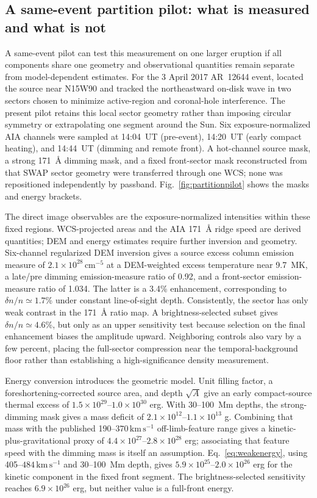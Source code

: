 \documentclass[11pt]{article}
\let\textcite\citet
\newcommand{\kms}{\mathrm{km\,s^{-1}}}
\begin{document}
\subsection{A same-event partition pilot: what is measured and what is not}
A same-event pilot can test this measurement on one larger eruption if all components share one geometry and observational quantities remain separate from model-dependent estimates. For the 3 April 2017 AR~12644 event, \textcite{OHara2019} located the source near N15W90 and tracked the northeastward on-disk wave in two sectors chosen to minimize active-region and coronal-hole interference. The present pilot retains this local sector geometry rather than imposing circular symmetry or extrapolating one segment around the Sun. Six exposure-normalized AIA channels were sampled at 14:04~UT (pre-event), 14:20~UT (early compact heating), and 14:44~UT (dimming and remote front). A hot-channel source mask, a strong 171~\AA{} dimming mask, and a fixed front-sector mask reconstructed from that SWAP sector geometry were transferred through one WCS; none was repositioned independently by passband. Fig.~\ref{fig:partitionpilot} shows the masks and energy brackets.

The direct image observables are the exposure-normalized intensities within these fixed regions. WCS-projected areas and the AIA 171~\AA{} ridge speed are derived quantities; DEM and energy estimates require further inversion and geometry. Six-channel regularized DEM inversion gives a source excess column emission measure of $2.1\times10^{28}\,\mathrm{cm^{-5}}$ at a DEM-weighted excess temperature near 9.7~MK, a late/pre dimming emission-measure ratio of 0.92, and a front-sector emission-measure ratio of 1.034. The latter is a 3.4\% enhancement, corresponding to $\delta n/n\simeq1.7$\% under constant line-of-sight depth. Consistently, the sector has only weak contrast in the 171~\AA{} ratio map. A brightness-selected subset gives $\delta n/n\simeq4.6$\%, but only as an upper sensitivity test because selection on the final enhancement biases the amplitude upward. Neighboring controls also vary by a few percent, placing the full-sector compression near the temporal-background floor rather than establishing a high-significance density measurement.

Energy conversion introduces the geometric model. Unit filling factor, a foreshortening-corrected source area, and depth $\sqrt{A}$ give an early compact-source thermal excess of $1.5\times10^{29}$--$1.0\times10^{30}$ erg. With 30--100~Mm depths, the strong-dimming mask gives a mass deficit of $2.1\times10^{12}$--$1.1\times10^{13}$ g. Combining that mass with the published 190--$370\,\kms$ off-limb-feature range gives a kinetic-plus-gravitational proxy of $4.4\times10^{27}$--$2.8\times10^{28}$ erg; associating that feature speed with the dimming mass is itself an assumption. Eq.~\eqref{eq:weakenergy}, using 405--$484\,\kms$ and 30--100~Mm depth, gives $5.9\times10^{25}$--$2.0\times10^{26}$ erg for the kinetic component in the fixed front segment. The brightness-selected sensitivity reaches $6.9\times10^{26}$ erg, but neither value is a full-front energy.
\end{document}
